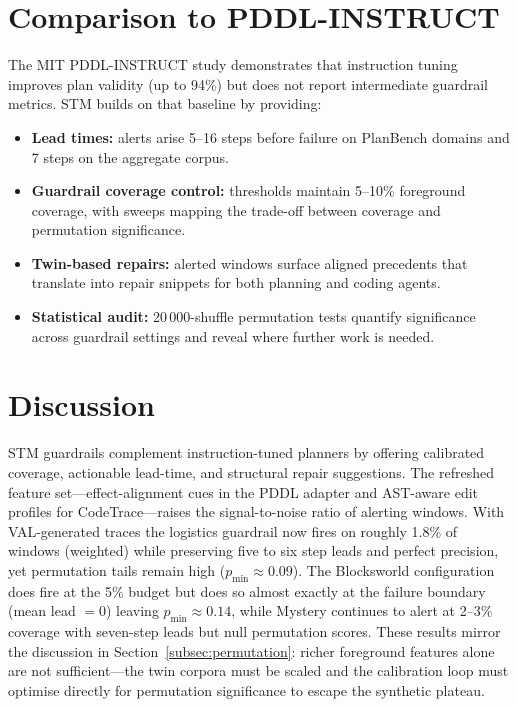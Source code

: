 \documentclass[11pt]{article}
\begin{document}
\section{Comparison to PDDL-INSTRUCT}
The MIT PDDL-INSTRUCT study \cite{verma2025pddlinstruct} demonstrates that
instruction tuning improves plan validity (up to 94\%) but does not report
intermediate guardrail metrics. STM builds on that baseline by providing:
\begin{itemize}
  \item \textbf{Lead times:} alerts arise 5--16 steps before failure on PlanBench
  domains and 7 steps on the aggregate corpus.
  \item \textbf{Guardrail coverage control:} thresholds maintain 5--10\% foreground
  coverage, with sweeps mapping the trade-off between coverage and permutation
  significance.
  \item \textbf{Twin-based repairs:} alerted windows surface aligned precedents
  that translate into repair snippets for both planning and coding agents.
  \item \textbf{Statistical audit:} 20\,000-shuffle permutation tests quantify
  significance across guardrail settings and reveal where further work is needed.
\end{itemize}

\section{Discussion}
STM guardrails complement instruction-tuned planners by offering calibrated
coverage, actionable lead-time, and structural repair suggestions. The refreshed
feature set---effect-alignment cues in the PDDL adapter and AST-aware edit
profiles for CodeTrace---raises the signal-to-noise ratio of alerting windows.
With VAL-generated traces the logistics guardrail now fires on roughly
1.8\% of windows (weighted) while preserving five to six step leads and perfect
precision, yet permutation tails remain high ($p_{\min}\approx 0.09$). The
Blocksworld configuration does fire at the 5\% budget but does so almost exactly
at the failure boundary (mean lead $=0$) leaving $p_{\min}\approx 0.14$, while
Mystery continues to alert at 2--3\% coverage with seven-step leads but null
permutation scores. These results mirror the discussion in
Section~\ref{subsec:permutation}: richer foreground features alone are not
sufficient—the twin corpora must be scaled and the calibration loop must
optimise directly for permutation significance to escape the synthetic plateau.
\end{document}
